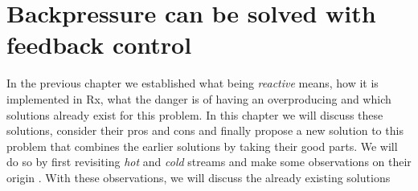 \chapter{Backpressure can be solved with feedback control}

In the previous chapter we established what being \textit{reactive} means, how it is implemented in Rx, what the danger is of having an overproducing \obs and which solutions already exist for this problem. In this chapter we will discuss these solutions, consider their pros and cons and finally propose a new solution to this problem that combines the earlier solutions by taking their good parts. We will do so by first revisiting \textit{hot} and \textit{cold} streams and make some observations on their origin . With these observations, we will discuss the already existing solutions 



